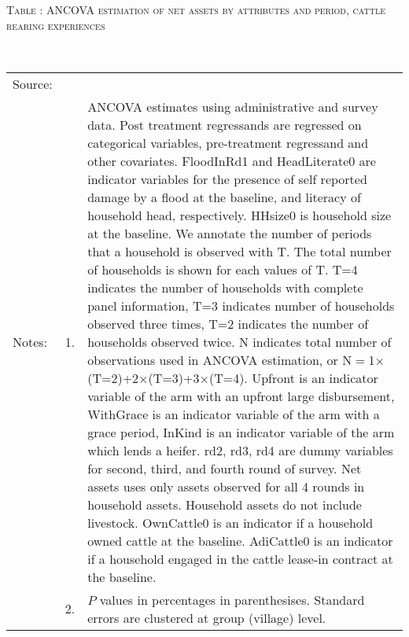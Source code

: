 \vspace{-1cm}\hspace{-1cm}\begin{minipage}[t]{14cm}
\hfil\textsc{\normalsize Table \thetable: ANCOVA estimation of net assets by attributes and period, cattle rearing experiences\label{tab ANCOVA narrow net assets Experience timevarying attributes}}\\
\setlength{\tabcolsep}{1pt}
\setlength{\baselineskip}{8pt}
\renewcommand{\arraystretch}{.52}
\hfil{}\\
\renewcommand{\arraystretch}{.8}
\setlength{\tabcolsep}{1pt}
\begin{tabular}{>{\hfill\scriptsize}p{1cm}<{}>{\hfill\scriptsize}p{.25cm}<{}>{\scriptsize}p{12cm}<{\hfill}}
Source:& \multicolumn{2}{l}{\scriptsize Estimated with GUK administrative and survey data.}\\
Notes: & 1. & ANCOVA estimates using administrative and survey data. Post treatment regressands are regressed on categorical variables, pre-treatment regressand and other covariates. \textsf{FloodInRd1} and \textsf{HeadLiterate0} are indicator variables for the presence of self reported damage by a flood at the baseline, and literacy of household head, respectively. \textsf{HHsize0} is household size at the baseline. We annotate the number of periods that a household is observed with \textsf{T}. The total number of households is shown for each values of \textsf{T}. \textsf{T=4} indicates the number of households with complete panel information, \textsf{T=3} indicates number of households observed three times, \textsf{T=2} indicates the number of households observed twice. \textsf{N} indicates total number of observations used in ANCOVA estimation, or \textsf{N$=$1$\times$(T=2)+2$\times$(T=3)+3$\times$(T=4)}.  \textsf{Upfront} is an indicator variable of the arm with an upfront large disbursement, \textsf{WithGrace} is an indicator variable of the arm with a grace period, \textsf{InKind} is an indicator variable of the arm which lends a heifer. \textsf{rd2, rd3, rd4} are dummy variables for second, third, and fourth round of survey. Net assets uses only assets observed for all 4 rounds in household assets. Household assets do not include livestock. \textsf{OwnCattle0} is an indicator if a household owned cattle at the baseline. \textsf{AdiCattle0} is an indicator if a household engaged in the cattle lease-in contract at the baseline.  \\
& 2. & $P$ values in percentages in parenthesises. Standard errors are clustered at group (village) level.
\end{tabular}
\end{minipage}


